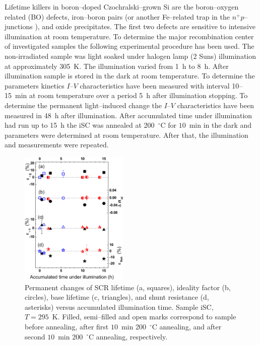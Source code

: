 \documentclass[aip,jap, amsmath,amssymb,reprint]{revtex4-1}
\begin{document}
Lifetime killers  in boron--doped Czochralski--grown Si are the  boron--oxygen related (BO) defects,\cite{LIDRev,LIDRev2}
iron--boron pairs \cite{MurphyJAP2011,FeB:Vahanissi,FeB:Schmidt} (or another Fe--related trap in the $n^+p$--junctions \cite{TeimurazPSS,TeimurazJAP}),
and oxide precipitates.\cite{MurphySC2014,Oxide_Schon,MurphyJAP2011,MurphyJAP2012,Oxide:Chen,Oxide:Porrini}
The first two defects are sensitive to intensive illumination at room temperature.
To determine the major recombination center of investigated samples the following experimental procedure has been used.
The non-irradiated sample was light soaked under halogen lamp (2 Suns) illumination at approximately 305~K.
The illumination varied from 1~h to 8~h.
After illumination sample is stored in the dark at room temperature.
To determine the parameters kinetics $I$--$V$ characteristics have been measured with interval 10--15~min at room temperature over a period 5~h after illumination stopping.
To determine the permanent light--induced change the $I$--$V$ characteristics have been measured in 48~h after illumination.
After accumulated time under illumination had run up to 15~h the iSC was annealed at 200~$^\circ$C for $10$~min in the dark and parameters were determined at room temperature.
After that, the illumination and measurements were repeated.


\begin{figure}
\includegraphics[width=0.46\textwidth]{fig_10}%
\caption{\label{fig_Illum}
Permanent changes of SCR lifetime (a, squares), ideality factor (b, circles), base lifetime (c, triangles), and shunt resistance (d, asterisks) versus accumulated illumination time.
Sample iSC, $T=295$~K.
Filled, semi--filled and open marks correspond to sample before annealing, after first $10$~min 200~$^\circ$C annealing, and after second $10$~min 200~$^\circ$C annealing, respectively.
}%
\end{figure}
\end{document}
